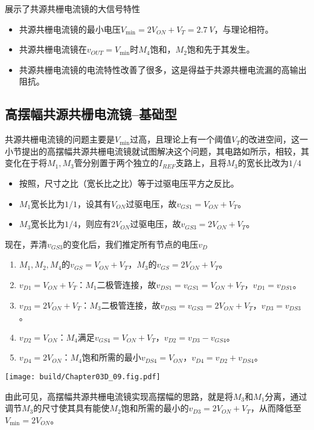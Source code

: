 展示了共源共栅电流镜的大信号特性
\begin{itemize}
    \item 共源共栅电流镜的最小电压$V_{\min}=2V_{ON}+V_T=\SI{2.7}{V}$，与理论相符。
    \item 共源共栅电流镜在$v_{OUT}=V_{\min}$时$M_4$饱和，$M_2$饱和先于其发生。
    \item 共源共栅电流镜的电流特性改善了很多，这是得益于共源共栅电流漏的高输出阻抗。
\end{itemize}

\subsection{高摆幅共源共栅电流镜--基础型}
共源共栅电流镜的问题主要是$V_{\min}$过高，且理论上有一个阈值$V_T$的改进空间，这一小节提出的高摆幅共源共栅电流镜就试图解决这个问题，其电路如所示，相较，其变化在于将$M_1,M_3$管分别置于两个独立的$I_{REF}$支路上，且将$M_3$的宽长比改为$1/4$
\begin{itemize}
    \item 按照，尺寸之比（宽长比之比）等于过驱电压平方之反比。
    \item $M_1$宽长比为$1/1$，设其有$V_{ON}$过驱电压，故$v_{GS1}=V_{ON}+V_T$。
    \item $M_3$宽长比为$1/4$，则应有$2V_{ON}$过驱电压，故$v_{GS3}=2V_{ON}+V_T$。
\end{itemize}
现在，弄清$v_{GS3}$的变化后，我们推定所有节点的电压$v_D$
\begin{enumerate}
    \item $M_1,M_2,M_4$的$v_{GS}=V_{ON}+V_T$，$M_3$的$v_{GS}=2V_{ON}+V_T$。
    \item $v_{D1}=V_{ON}+V_T$：$M_1$二极管连接，故$v_{DS1}=v_{GS1}=V_{ON}+V_T$，$v_{D1}=v_{DS1}$。
    \item $v_{D3}=2V_{ON}+V_T$：$M_3$二极管连接，故$v_{DS3}=v_{GS3}=2V_{ON}+V_T$，$v_{D3}=v_{DS3}$。
    \item $v_{D2}=V_{ON}$：$M_4$满足$v_{GS4}=V_{ON}+V_T$，$v_{D2}=v_{D3}-v_{GS4}$。
    \item $v_{D4}=2V_{ON}$：$M_4$饱和所需的最小$v_{DS4}=V_{ON}$，$v_{D4}=v_{D2}+v_{DS4}$。
\end{enumerate}
\begin{Figure}
    \texttt{[image: build/Chapter03D\_09.fig.pdf]}
\end{Figure}
由此可见，高摆幅共源共栅电流镜实现高摆幅的思路，就是将$M_3$和$M_1$分离，通过调节$M_3$的尺寸使其具有能使$M_2$饱和所需的最小的$v_{D3}=2V_{ON}+V_T$，从而降低至$V_{\min}=2V_{ON}$。

